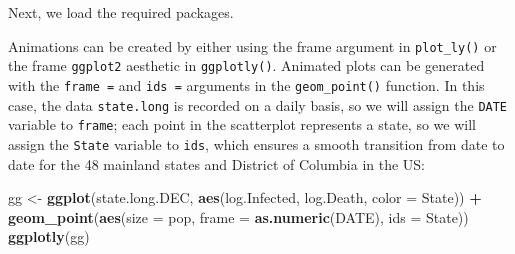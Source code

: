 \documentclass[]{book}
\newenvironment{Shaded}{\begin{snugshade}}{\end{snugshade}}
\newcommand{\KeywordTok}[1]{\textcolor[rgb]{0.13,0.29,0.53}{\textbf{#1}}}
\newcommand{\DataTypeTok}[1]{\textcolor[rgb]{0.13,0.29,0.53}{#1}}
\newcommand{\DecValTok}[1]{\textcolor[rgb]{0.00,0.00,0.81}{#1}}
\newcommand{\StringTok}[1]{\textcolor[rgb]{0.31,0.60,0.02}{#1}}
\newcommand{\CommentTok}[1]{\textcolor[rgb]{0.56,0.35,0.01}{\textit{#1}}}
\newcommand{\OperatorTok}[1]{\textcolor[rgb]{0.81,0.36,0.00}{\textbf{#1}}}
\newcommand{\NormalTok}[1]{#1}
\begin{document}
\begin{Shaded}
\end{Shaded}

Next, we load the required packages.

Animations can be created by either using the frame argument in
\texttt{plot\_ly()} or the frame \texttt{ggplot2} aesthetic in
\texttt{ggplotly()}. Animated plots can be generated with the
\texttt{frame\ =} and \texttt{ids\ =} arguments in the
\texttt{geom\_point()} function. In this case, the data
\texttt{state.long} is recorded on a daily basis, so we will assign the
\texttt{DATE} variable to \texttt{frame}; each point in the scatterplot
represents a state, so we will assign the \texttt{State} variable to
\texttt{ids}, which ensures a smooth transition from date to date for
the 48 mainland states and District of Columbia in the US:

\begin{Shaded}
\begin{Highlighting}[]
\NormalTok{gg <-}\StringTok{ }\KeywordTok{ggplot}\NormalTok{(state.long.DEC, }\KeywordTok{aes}\NormalTok{(log.Infected, log.Death, }\DataTypeTok{color =}\NormalTok{ State)) }\OperatorTok{+}
\StringTok{  }\KeywordTok{geom_point}\NormalTok{(}\KeywordTok{aes}\NormalTok{(}\DataTypeTok{size =}\NormalTok{ pop, }\DataTypeTok{frame =} \KeywordTok{as.numeric}\NormalTok{(DATE), }\DataTypeTok{ids =}\NormalTok{ State)) }
\KeywordTok{ggplotly}\NormalTok{(gg)}
\end{Highlighting}
\end{Shaded}
\end{document}
